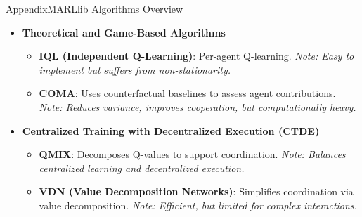 \begin{frame}[allowframebreaks]{Appendix}{MARLlib Algorithms Overview}
\begin{itemize}
        \item \textbf{Theoretical and Game-Based Algorithms}
              \begin{itemize}
                  \item \textbf{IQL (Independent Q-Learning)}: Per-agent Q-learning.\newline
                  \textit{Note: Easy to implement but suffers from non-stationarity.}
                  \item \textbf{COMA}: Uses counterfactual baselines to assess agent contributions.\newline
                  \textit{Note: Reduces variance, improves cooperation, but computationally heavy.}
              \end{itemize}

        \item \textbf{Centralized Training with Decentralized Execution (CTDE)}
              \begin{itemize}
                  \item \textbf{QMIX}: Decomposes Q-values to support coordination.\newline
                  \textit{Note: Balances centralized learning and decentralized execution.}
                  \item \textbf{VDN (Value Decomposition Networks)}: Simplifies coordination via value decomposition.\newline
                  \textit{Note: Efficient, but limited for complex interactions.}
              \end{itemize}
    \end{itemize}

\end{frame}
